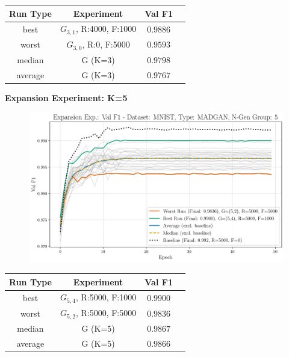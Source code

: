 \begin{table}[H]
	\vspace{-1.5em}
	\centering
	\begin{tabular}{|c|c|c|c|}
		\hline
		Run Type & Experiment & Val F1 \\ \hline
		best & \(G_{3, 1}\), R:4000, F:1000 & $0.9886$\\ \hline
		worst & \(G_{3, 0}\), R:0, F:5000 & $0.9593$\\ \hline
		median & G (K=3) & $0.9798$\\ \hline
		average & G (K=3) & $0.9767$
		\\ \hline
	\end{tabular}
\end{table}
\newpage
\noindent\textbf{Expansion Experiment: K=5}
\begin{figure}[htbp]
	\centering
	\includegraphics[width=.85\textwidth]{abb/strat_classifier_performance/MNIST_STRATIFIED_CLASSIFIERS_MADGAN_NEW/expansion_experiments/val_f1_score_MADGAN_MNIST_n_gen_5_all.png}
	\label{fig:app_strat_class_performance_expansion_exp._val_f1_score_5}
\end{figure}
\begin{table}[H]
	\vspace{-1em}
	\centering
	\begin{tabular}{|c|c|c|c|}
		\hline
		Run Type & Experiment & Val F1 \\ \hline
		best & \(G_{5, 4}\), R:5000, F:1000 & $0.9900$\\ \hline
		worst & \(G_{5, 2}\), R:5000, F:5000 & $0.9836$\\ \hline
		median & G (K=5) & $0.9867$\\ \hline
		average & G (K=5) & $0.9866$
		\\ \hline
	\end{tabular}
\end{table}
